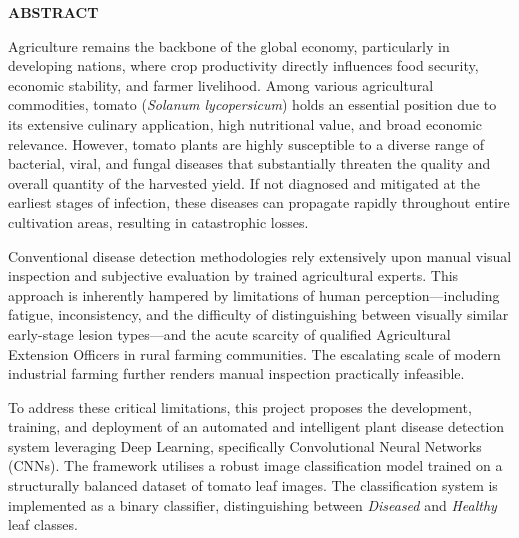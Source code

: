 \documentclass[12pt,a4paper]{report}
\begin{document}
\clearpage
\thispagestyle{plain}
\begin{center}
  {\Large\textbf{ABSTRACT}}
\end{center}
\vspace{16pt}

\noindent Agriculture remains the backbone of the global economy, particularly in developing nations, where crop productivity directly influences food security, economic stability, and farmer livelihood. Among various agricultural commodities, tomato (\textit{Solanum lycopersicum}) holds an essential position due to its extensive culinary application, high nutritional value, and broad economic relevance. However, tomato plants are highly susceptible to a diverse range of bacterial, viral, and fungal diseases that substantially threaten the quality and overall quantity of the harvested yield. If not diagnosed and mitigated at the earliest stages of infection, these diseases can propagate rapidly throughout entire cultivation areas, resulting in catastrophic losses.

\vspace{10pt}

\noindent Conventional disease detection methodologies rely extensively upon manual visual inspection and subjective evaluation by trained agricultural experts. This approach is inherently hampered by limitations of human perception---including fatigue, inconsistency, and the difficulty of distinguishing between visually similar early-stage lesion types---and the acute scarcity of qualified Agricultural Extension Officers in rural farming communities. The escalating scale of modern industrial farming further renders manual inspection practically infeasible.

\vspace{10pt}

\noindent To address these critical limitations, this project proposes the development, training, and deployment of an automated and intelligent plant disease detection system leveraging Deep Learning, specifically Convolutional Neural Networks (CNNs). The framework utilises a robust image classification model trained on a structurally balanced dataset of tomato leaf images. The classification system is implemented as a binary classifier, distinguishing between \textit{Diseased} and \textit{Healthy} leaf classes.
\end{document}
